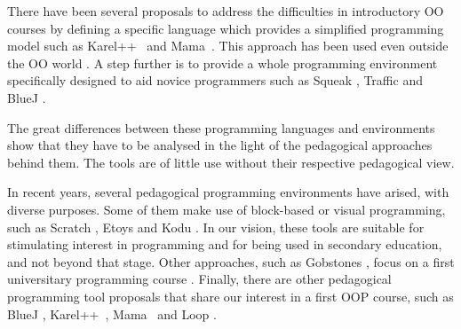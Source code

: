 


There have been several proposals to address the difficulties in introductory OO courses 
by defining a specific language which provides a simplified programming model such as Karel++~\cite{bergin_karel++:_1996} and Mama~\cite{harrisonmama}.
This approach has been used even outside the OO world \cite{feurzeig_programming-languages_1970, pattis_karel_1981, lopez_nombre_2012}.
A step further is to provide a whole programming environment specifically designed to aid novice programmers 
such as Squeak \cite{ingalls_back_1997}, Traffic \cite{broy_outside-method_2003} and BlueJ \cite{bennedsen_bluej_2010}. 

The great differences between these programming languages and environments show that they have to be analysed in the light of the pedagogical approaches behind them.
The tools are of little use without their respective pedagogical view.



In recent years, several pedagogical programming environments have arised, with diverse purposes.
Some of them make use of block-based or visual programming, 
such as Scratch \cite{malan_scratch_2007}, Etoys \cite{lee_empowering_2011} and Kodu \cite{kodu}. 
In our vision, these tools are suitable for stimulating interest in programming and for being used in secondary education, and not beyond that stage.
Other approaches, such as Gobstones \cite{lopez_nombre_2012}, focus on a first universitary programming course%
.
Finally, there are other pedagogical programming tool proposals that share our interest in a first OOP course, such as BlueJ \cite{bennedsen_bluej_2010}, Karel++~\cite{bergin_karel++:_1996}, Mama~\cite{harrisonmama} and Loop \cite{griggio_programming_2011}.

